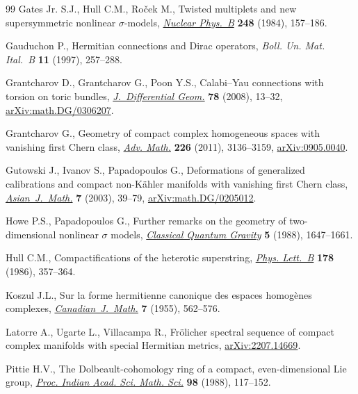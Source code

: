 \begin{thebibliography}{99}
Gates Jr. S.J., Hull C.M., Ro\v{c}ek M., Twisted multiplets and new
 supersymmetric nonlinear {$\sigma$}-models, \href{https://doi.org/10.1016/0550-3213(84)90592-3}{\textit{Nuclear Phys.~B}}
 \textbf{248} (1984), 157--186.

Gauduchon P., Hermitian connections and {D}irac operators, \textit{Boll. Un.
 Mat. Ital.~B} \textbf{11} (1997), 257--288.

Grantcharov D., Grantcharov G., Poon Y.S., Calabi--{Y}au connections with
 torsion on toric bundles, \href{https://doi.org/10.4310/jdg/1197320602}{\textit{J.~Differential Geom.}} \textbf{78} (2008),
 13--32, \href{https://arxiv.org/abs/math.DG/0306207}{arXiv:math.DG/0306207}.

Grantcharov G., Geometry of compact complex homogeneous spaces with vanishing
 first {C}hern class, \href{https://doi.org/10.1016/j.aim.2010.10.005}{\textit{Adv. Math.}} \textbf{226} (2011), 3136--3159,
 \href{https://arxiv.org/abs/0905.0040}{arXiv:0905.0040}.

Gutowski J., Ivanov S., Papadopoulos G., Deformations of generalized
 calibrations and compact non-{K}\"ahler manifolds with vanishing first
 {C}hern class, \href{https://doi.org/10.4310/AJM.2003.v7.n1.a4}{\textit{Asian~J.~Math.}} \textbf{7} (2003), 39--79,
 \href{https://arxiv.org/abs/math.DG/0205012}{arXiv:math.DG/0205012}.

Howe P.S., Papadopoulos G., Further remarks on the geometry of two-dimensional
 nonlinear {$\sigma$} models, \href{https://doi.org/10.1088/0264-9381/5/12/014}{\textit{Classical Quantum Gravity}} \textbf{5}
 (1988), 1647--1661.

Hull C.M., Compactifications of the heterotic superstring, \href{https://doi.org/10.1016/0370-2693(86)91393-6}{\textit{Phys.
 Lett.~B}} \textbf{178} (1986), 357--364.

Koszul J.L., Sur la forme hermitienne canonique des espaces homog\`enes
 complexes, \href{https://doi.org/10.4153/CJM-1955-061-3}{\textit{Canadian~J.~Math.}} \textbf{7} (1955), 562--576.

Latorre A., Ugarte L., Villacampa R., Fr\"olicher spectral sequence of compact
 complex manifolds with special {H}ermitian metrics, \href{https://arxiv.org/abs/2207.14669}{arXiv:2207.14669}.

Pittie H.V., The {D}olbeault-cohomology ring of a compact, even-dimensional
 {L}ie group, \href{https://doi.org/10.1007/BF02863632}{\textit{Proc. Indian Acad. Sci. Math. Sci.}} \textbf{98} (1988),
 117--152.


\end{thebibliography}
